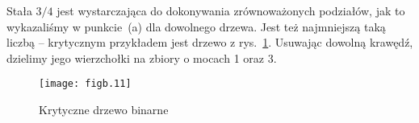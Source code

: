 \subexercise{} %
Stała $3/4$ jest wystarczająca do dokonywania zrównoważonych podziałów, jak to wykazaliśmy w punkcie~(a) dla dowolnego drzewa. Jest też najmniejszą taką liczbą -- krytycznym przykładem jest drzewo z rys.~\ref{fig:B-3b}. Usuwając dowolną krawędź, dzielimy jego wierzchołki na zbiory o mocach 1 oraz 3.
\begin{figure}[ht]
	\begin{center}
		\texttt{[image: figb.11]}
	\end{center}
	\caption{Krytyczne drzewo binarne} \label{fig:B-3b}
\end{figure}

\subexercise{} %

\endinput
